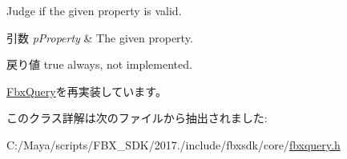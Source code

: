 Judge if the given property is valid. 
\begin{DoxyParams}{引数}
{\em p\+Property} & The given property. \\
\hline
\end{DoxyParams}
\begin{DoxyReturn}{戻り値}
{\ttfamily true} always, not implemented. 
\end{DoxyReturn}


\hyperlink{class_fbx_query_a822776baf45a56d8e126e948ec25d920}{Fbx\+Query}を再実装しています。



このクラス詳解は次のファイルから抽出されました\+:\begin{DoxyCompactItemize}
\item 
C\+:/\+Maya/scripts/\+F\+B\+X\+\_\+\+S\+D\+K/2017./include/fbxsdk/core/\hyperlink{fbxquery_8h}{fbxquery.\+h}\end{DoxyCompactItemize}
